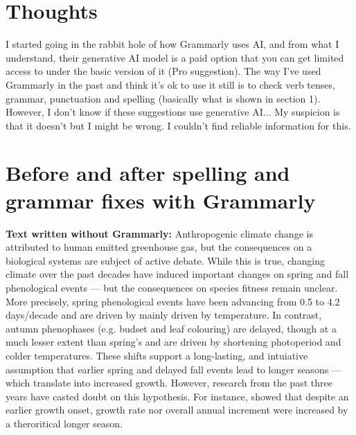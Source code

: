 \documentclass[12pt]{article}
\begin{document}
\section{Thoughts}
I started going in the rabbit hole of how Grammarly uses AI, and from what I understand, their generative AI model is a paid option that you can get limited access to under the basic version of it (Pro suggestion). The way I've used Grammarly in the past and think it's ok to use it still is to check verb tenses, grammar, punctuation and spelling (basically what is shown in section 1). However, I don't know if these suggestions use generative AI... My suspicion is that it doesn't but I might be wrong. I couldn't find reliable information for this.\\

\section{Before and after spelling and grammar fixes with Grammarly}

\textbf {Text written without Grammarly:} Anthropogenic climate change is attributed to human emitted greenhouse gas, but the consequences on a biological systems are subject of active debate. While this is true, changing climate over the past decades have induced important changes on spring and fall phenological events --- but the consequences on species fitness remain unclear. More precisely, spring phenological events have been advancing from 0.5 to 4.2 days/decade  and are driven by mainly driven by temperature. In contrast, autumn phenophases (e.g. budset and leaf colouring) are delayed, though at a much lesser extent than spring's and are driven by shortening photoperiod and colder temperatures. These shifts support a long-lasting, and intuiative assumption that earlier spring and delayed fall events lead to longer seasons ---which translate into increased growth. However, research from the past three years have casted doubt on this hypothesis. For instance, showed that despite an earlier growth onset, growth rate nor overall annual increment were increased by a theroritical longer season. 
\end{document}
